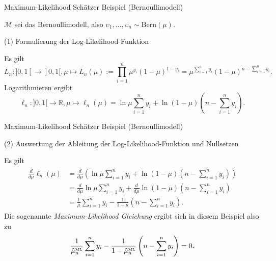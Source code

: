 \documentclass[
  8pt,
  ignorenonframetext,
]{beamer}
\newcommand{\ups} {\upsilon}
\begin{document}
\begin{frame}{Maximum-Likelihood Schätzer}
\protect\hypertarget{maximum-likelihood-schuxe4tzer-3}{}
Beispiel (Bernoullimodell)

\small

\(\mathcal{M}\) sei das Bernoullimodell, also
\(\ups_1,...,\ups_n \sim \mbox{Bern}(\mu)\).

\noindent (1) Formulierung der Log-Likelihood-Funktion

\footnotesize

Es gilt \begin{equation}
L_n : ]0,1[ \to ]0,1[,
\mu \mapsto L_n(\mu)
:= \prod_{i=1}^n \mu^{y_i}(1 - \mu)^{1-y_i}
 = \mu^{\sum_{i=1}^n y_i}(1 - \mu)^{n - \sum_{i=1}^n y_i}.
\end{equation} Logarithmieren ergibt \begin{equation}
\ell_n : ]0,1[ \to \mathbb{R}, \mu \mapsto  \ell_n(\mu)
= \ln \mu \sum_{i=1}^n y_i + \ln (1- \mu) \left(n - \sum_{i=1}^n y_i \right).
\end{equation}
\end{frame}

\begin{frame}{Maximum-Likelihood Schätzer}
\protect\hypertarget{maximum-likelihood-schuxe4tzer-4}{}
Beispiel (Bernoullimodell)

\small

\noindent (2) Auswertung der Ableitung der Log-Likelihood-Funktion und
Nullsetzen

\footnotesize

Es gilt \begin{align}
\begin{split}
\frac{d}{d\mu} \ell_n(\mu)
& = \frac{d}{d\mu}\left(\ln \mu \sum_{i=1}^n y_i + \ln (1- \mu) \left(n - \sum_{i=1}^n y_i \right)\right)  \\
& = \frac{d}{d\mu} \ln \mu \sum_{i=1}^n y_i  + \frac{d}{d\mu} \ln (1 - \mu) \left(n - \sum_{i=1}^n y_i \right)  \\
& = \frac{1}{\mu}\sum_{i=1}^n y_i  -  \frac{1}{1-\mu} \left(n - \sum_{i=1}^n y_i \right).
\end{split}
\end{align} Die sogenannte \textit{Maximum-Likelihood Gleichung} ergibt
sich in diesem Beispiel also zu \begin{equation}
\frac{1}{\hat{\mu}_{n}^{\mbox{\tiny ML}}}\sum_{i=1}^n y_i - \frac{1}{1-\hat{\mu}_{n}^{\mbox{\tiny ML}}} \left(n - \sum_{i=1}^n y_i \right) = 0.
\end{equation}
\end{frame}
\end{document}
